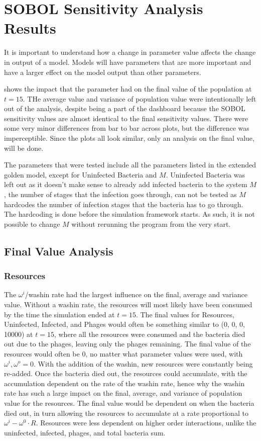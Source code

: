 \section{SOBOL Sensitivity Analysis Results}
\label{sec:SOBOL_sensitivity_analysis_results}
It is important to understand how a change in parameter value affects the change in output of a model. 
Models will have parameters that are more important and have a larger effect on the model output than other parameters. 

 shows the impact that the parameter had on the final value of the population at $t=15$. 
THe average value and variance of population value were intentionally left out of the analysis, despite being a part of the dashboard because the SOBOL sensitivity values are almost identical to the final sensitivity values. 
There were some very minor differences from bar to bar across plots, but the difference was imperceptible. 
Since the plots all look similar, only an analysis on the final value,  will be done. 

The parameters that were tested include all the parameters listed in the extended golden model, except for Uninfected Bacteria and $M$. 
Uninfected Bacteria was left out as it doesn't make sense to already add infected bacteria to the system
$M$, the number of stages that the infection goes through, can not be tested as $M$ hardcodes the number of infection stages that the bacteria has to go through. 
The hardcoding is done before the simulation framework starts. 
As such, it is not possible to change $M$ without rerunning the program from the very start. 

\subsection{Final Value Analysis}
\subsubsection{Resources}
The $\omega^i$/washin rate had the largest influence on the final, average and variance value. 
Without a washin rate, the resources will most likely have been consumed by the time the simulation ended at $t=15$. 
The final values for Resources, Uninfected, Infected, and Phages would often be something similar to (0, 0, 0, 10000) at $t=15$, where all the resources were consumed and the bacteria died out due to the phages, leaving only the phages remaining. 
The final value of the resources would often be 0, no matter what parameter values were used, with $\omega^i, \omega^o = 0$. 
With the addition of the washin, new resources were constantly being re-added. 
Once the bacteria died out, the resources could accumulate, with the accumulation dependent on the rate of the washin rate, hence why the washin rate has such a large impact on the final, average, and variance of population value for the resources. 
The final value would be dependent on when the bacteria died out, in turn allowing the resources to accumulate at a rate proportional to $\omega^i - \omega^0\cdot R$. 
Resources were less dependent on higher order interactions, unlike the uninfected, infected, phages, and total bacteria sum. 

